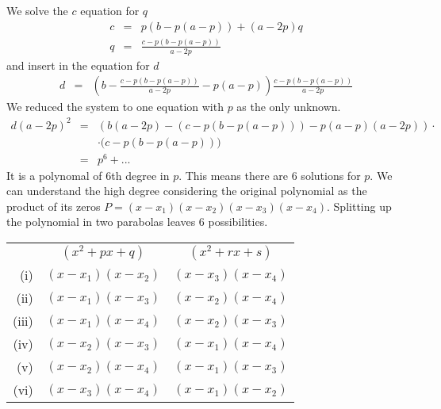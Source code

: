 \documentclass[12pt,a4paper,twoside,openright,BCOR10mm,headsepline,titlepage,abstracton,chapterprefix,final]{scrreprt}
\begin{document}
We solve the $c$ equation for $q$
\begin{eqnarray}
 c &=& p(b - p (a- p)) + ( a- 2p )q \\
 q &=& \frac{c - p(b - p (a- p))}{a- 2p}
\end{eqnarray}
and insert in the equation for $d$
\begin{eqnarray}
    d &=& \left(b - \frac{c - p(b - p (a- p))}{a- 2p} - p (a- p)\right)\frac{c - p(b - p (a- p))}{a- 2p}
\end{eqnarray}
We reduced the system to one equation with $p$ as the only unknown.
\begin{eqnarray}
    d (a-2p)^2 &=& 
    \left(b(a-2p) - (c - p(b - p (a- p))) - p (a- p)(a-2p)\right)\cdot\nonumber\\
    &&\cdot\big(c - p(b - p (a- p))\big)
    \\
    &=& p^6 + ...
\end{eqnarray}
It is a polynomal of 6th degree in $p$.
This means there are 6 solutions for $p$.
We can understand the high degree considering the original polynomial as the product of its zeros $P=(x-x_1)(x-x_2)(x-x_3)(x-x_4)$.
Splitting up the polynomial in two parabolas leaves 6 possibilities.

\begin{tabular}{r|c|c}
       & $(x^2 + px + q)$ & $(x^2 + rx + s)$\\
 (i)   & $(x-x_1)(x-x_2)$ & $(x-x_3)(x-x_4)$\\
 (ii)  & $(x-x_1)(x-x_3)$ & $(x-x_2)(x-x_4)$\\
 (iii) & $(x-x_1)(x-x_4)$ & $(x-x_2)(x-x_3)$\\
 (iv)  & $(x-x_2)(x-x_3)$ & $(x-x_1)(x-x_4)$\\
 (v)   & $(x-x_2)(x-x_4)$ & $(x-x_1)(x-x_3)$\\
 (vi)  & $(x-x_3)(x-x_4)$ & $(x-x_1)(x-x_2)$\\
\end{tabular}
\end{document}
